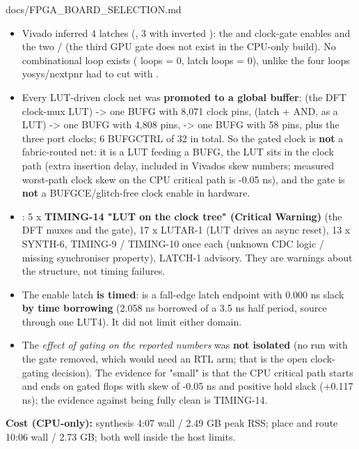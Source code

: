 \begin{relocated}{docs/FPGA_BOARD_SELECTION.md}
\begin{itemize}
\tightlist
\item
  Vivado inferred 4 latches (, 3 with inverted ): the
   and  clock-gate enables and the two
    /  (the third GPU
  gate does not exist in the CPU-only build). No combinational loop
  exists ( loops = 0, latch loops = 0), unlike the
  four loops yosys/\allowbreak{}nextpnr had to cut with
  .
\item
  Every LUT-driven clock net was \textbf{promoted to a global buffer}:
   (the DFT clock-mux LUT) -\textgreater{} one BUFG with
  8,071 clock pins,  (latch + AND, as a LUT)
  -\textgreater{} one BUFG with 4,808 pins, 
  -\textgreater{} one BUFG with 58 pins, plus the three port clocks; 6
  BUFGCTRL of 32 in total. So the gated clock is \textbf{not} a
  fabric-routed net: it is a LUT feeding a BUFG, the LUT sits in the
  clock path (extra insertion delay, included in
  Vivado\textquotesingle s skew numbers; measured worst-path clock skew
  on the CPU critical path is -0.05 ns), and the gate is \textbf{not} a
  BUFGCE/\allowbreak{}glitch-free clock enable in hardware.
\item
  : 5 x \textbf{TIMING-14 "LUT on the clock
  tree" (Critical Warning)} (the DFT muxes and the gate), 17 x LUTAR-1
  (LUT drives an async reset), 13 x SYNTH-6, TIMING-9 / TIMING-10 once
  each (unknown CDC logic / missing synchroniser property), LATCH-1
  advisory. They are warnings about the structure, not timing failures.
\item
  The enable latch \textbf{is timed}:  is
  a  fall-edge latch endpoint with 0.000 ns slack
  \textbf{by time borrowing} (2.058 ns borrowed of a 3.5 ns half period,
  source  through one LUT4). It did not limit
  either domain.
\item
  The \emph{effect of gating on the reported numbers} was \textbf{not
  isolated} (no run with the gate removed, which would need an RTL arm;
  that is the open clock-gating decision). The evidence for "small" is
  that the CPU critical path starts and ends on gated flops with skew of
  -0.05 ns and positive hold slack (+0.117 ns); the evidence against
  being fully clean is TIMING-14.
\end{itemize}

\textbf{Cost (CPU-only):} synthesis 4:07 wall / 2.49 GB peak RSS; place
and route 10:06 wall / 2.73 GB; both well inside the host limits.


\end{relocated}
